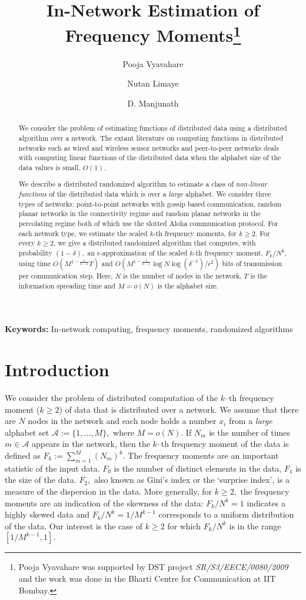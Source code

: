 \documentclass[10pt,twosided,a4paper,draft,onecolumn]{article}
\title{In-Network Estimation of Frequency Moments\footnote{Pooja
    Vyavahare was supported by DST project
    \textit{SR/S3/EECE/0080/2009} and the work was done in the Bharti
    Centre for Communication at IIT Bombay.  }}
\author[1]{Pooja Vyavahare}
\author[2]{Nutan Limaye}
\author[1]{D. Manjunath}
\affil[1]{Department of Electrical Engineering, IIT Bombay\\
\texttt{vpooja,dmanju@ee.iitb.ac.in}
}
\affil[2]{Department of Computer Science and Engineering, IIT Bombay\\
\texttt{nutan@cse.iitb.ac.in}}
\begin{document}
\maketitle



\begin{abstract}
  We consider the problem of estimating functions of distributed data
  using a distributed algorithm over a network.  The extant literature
  on computing functions in distributed networks such as wired and
  wireless sensor networks and peer-to-peer networks deals with
  computing linear functions of the distributed data when the alphabet
  size of the data values is small, $O(1)$.

  We describe a distributed randomized algorithm to estimate a class of
  \emph{non-linear functions} of the distributed data which is over a
  \emph{large} alphabet. We consider three types of networks:
  point-to-point networks with gossip based communication, random
  planar networks in the connectivity regime and random planar
  networks in the percolating regime both of which use the
  slotted Aloha communication protocol. For each network type, we estimate the scaled $k$-th
  frequency moments, for $k \geq 2$.  For every $k\geq
  2$, we give a distributed randomized algorithm that computes, with
  probability $(1-\delta),$ an $\epsilon$-approximation of the scaled
  $k$-th frequency moment, $F_k/N^k$, using time $O(M^{1-\frac{1}{k-1}} T)$ and 
  $O(M^{1-\frac{1}{k-1}} \log N \log (\delta^{-1})/\epsilon^2 )$ 
  bits of transmission per communication step.
  Here, $N$ is the number of nodes in the network, $T$ is the
  information spreading time and $M=o(N)$ is the alphabet size.
 
\end{abstract}
\textbf{Keywords:} In-network computing, frequency moments, randomized
algorithms
  
\section{Introduction}
\label{sec:intro}

We consider the problem of distributed computation of the $k$--th
frequency moment ($k \geq 2$) of data that is distributed over a
network. We assume that there are $N$ nodes in the network and each
node holds a number $x_i$ from a \textit{large} alphabet set
$\mathcal{A} := \{1, \ldots ,M\},$ where $M=o(N).$ If $N_m$ is the
number of times $m \in \mathcal{A}$ appears in the network, then the
$k$--th frequency moment of the data is defined as
$F_k:=\sum\limits_{m=1}^M (N_m)^k.$ The frequency moments are an
important statistic of the input data. $F_0$ is the number of distinct
elements in the data, $F_1$ is the size of the data. $F_2,$ also known
as Gini's index or the `surprise index', is a measure of the
dispersion in the data.  More generally, for $k \geq 2,$ the frequency
moments are an indication of the skewness of the data: $F_k/N^k=1$
indicates a highly skewed data and $F_k/N^k=1/M^{k-1}$ corresponds to
a uniform distribution of the data. Our interest is the case of $k\geq
2$ for which $F_k/N^k$ is in the range $[1/M^{k-1}, 1].$
\end{document}
